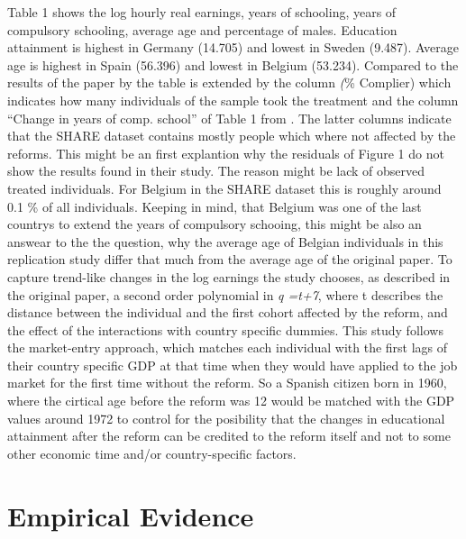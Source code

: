 \documentclass[12pt,a4paper]{article}
\begin{document}
Table 1 shows the log hourly real earnings, years of schooling, years of
compulsory schooling, average age and percentage of males. Education
attainment is highest in Germany (14.705) and lowest in Sweden (9.487).
Average age is highest in Spain (56.396) and lowest in Belgium (53.234).
Compared to the results of the paper by \textcite{brunello} the table is
extended by the column \textit(\% Complier) which indicates how many
individuals of the sample took the treatment and the column
\enquote{Change in years of comp. school} of Table 1 from
\textcite{brunello}. The latter columns indicate that the SHARE dataset
contains mostly people which where not affected by the reforms. This
might be an first explantion why the residuals of Figure 1 do not show
the results \textcite{brunello} found in their study. The reason might
be lack of observed treated individuals. For Belgium in the SHARE
dataset this is roughly around 0.1 \% of all individuals. Keeping in
mind, that Belgium was one of the last countrys to extend the years of
compulsory schooing, this might be also an answear to the the question,
why the average age of Belgian individuals in this replication study
differ that much from the average age of the original paper. To capture
trend-like changes in the log earnings the study chooses, as described
in the original paper, a second order polynomial in \textit{q =t+7},
where t describes the distance between the individual and the first
cohort affected by the reform, and the effect of the interactions with
country specific dummies. This study follows the market-entry approach,
which matches each individual with the first lags of their country
specific GDP at that time when they would have applied to the job market
for the first time without the reform. So a Spanish citizen born in
1960, where the cirtical age before the reform was 12 would be matched
with the GDP values around 1972 to control for the posibility that the
changes in educational attainment after the reform can be credited to
the reform itself and not to some other economic time and/or
country-specific factors.

\section{Empirical Evidence}\label{empirical-evidence}
\end{document}
